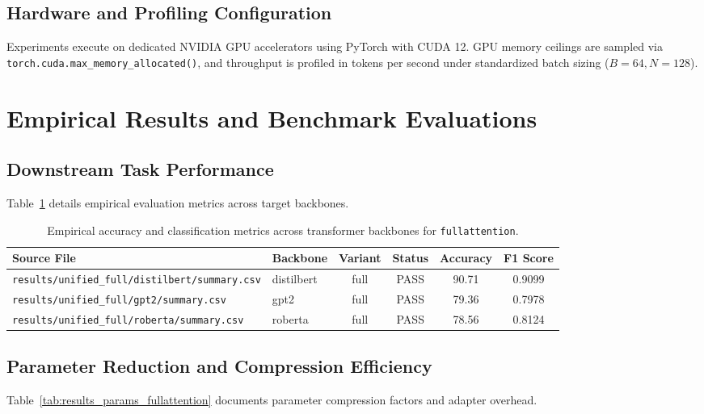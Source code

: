 {\subsection{Hardware and Profiling Configuration}
Experiments execute on dedicated NVIDIA GPU accelerators using PyTorch with CUDA 12. GPU memory ceilings are sampled via \texttt{torch.cuda.max\_memory\_allocated()}, and throughput is profiled in tokens per second under standardized batch sizing ($B=64, N=128$).


\section{Empirical Results and Benchmark Evaluations}

\subsection{Downstream Task Performance}
Table~\ref{tab:results_acc_fullattention} details empirical evaluation metrics across target backbones.

\begin{table}[t]
\centering
\small
\begin{tabular}{llcccc}
\toprule
\textbf{Source File} & \textbf{Backbone} & \textbf{Variant} & \textbf{Status} & \textbf{Accuracy} & \textbf{F1 Score} \\
\midrule
\texttt{results/unified\_full/distilbert/summary.csv} & distilbert & full & PASS & 90.71 & 0.9099 \\
\texttt{results/unified\_full/gpt2/summary.csv} & gpt2 & full & PASS & 79.36 & 0.7978 \\
\texttt{results/unified\_full/roberta/summary.csv} & roberta & full & PASS & 78.56 & 0.8124 \\
\bottomrule
\end{tabular}
\caption{Empirical accuracy and classification metrics across transformer backbones for \texttt{fullattention}.}
\label{tab:results_acc_fullattention}
\end{table}

\subsection{Parameter Reduction and Compression Efficiency}
Table~\ref{tab:results_params_fullattention} documents parameter compression factors and adapter overhead.

}
